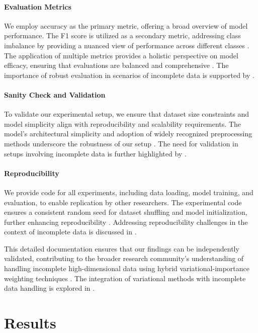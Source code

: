 \documentclass{article} %
\begin{document}
\paragraph{Evaluation Metrics} We employ accuracy as the primary metric, offering a broad overview of model performance. The F1 score is utilized as a secondary metric, addressing class imbalance by providing a nuanced view of performance across different classes \cite{robust2023,flexible2023}. The application of multiple metrics provides a holistic perspective on model efficacy, ensuring that evaluations are balanced and comprehensive \cite{a2023}. The importance of robust evaluation in scenarios of incomplete data is supported by \cite{survival2022,supervised2018,evaluating2023}.

\paragraph{Sanity Check and Validation} To validate our experimental setup, we ensure that dataset size constraints and model simplicity align with reproducibility and scalability requirements. The model's architectural simplicity and adoption of widely recognized preprocessing methods underscore the robustness of our setup \cite{lux2025}. The need for validation in setups involving incomplete data is further highlighted by \cite{quantum2013,fast2010}.

\paragraph{Reproducibility} We provide code for all experiments, including data loading, model training, and evaluation, to enable replication by other researchers. The experimental code ensures a consistent random seed for dataset shuffling and model initialization, further enhancing reproducibility \cite{mixfean2024,gaussian2024,bootstrap2024}. Addressing reproducibility challenges in the context of incomplete data is discussed in \cite{learned2020,mixed2014}.

This detailed documentation ensures that our findings can be independently validated, contributing to the broader research community's understanding of handling incomplete high-dimensional data using hybrid variational-importance weighting techniques \cite{massively2025,nonlinear2024,annealed2019}. The integration of variational methods with incomplete data handling is explored in \cite{variational2021,variational2021,explicit2024}.

\section{Results}
\end{document}
